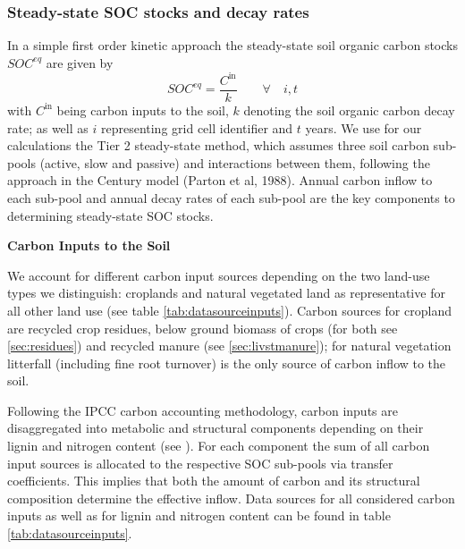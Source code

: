 \documentclass[gc, manuscript]{copernicus}
\begin{document}
\hypertarget{steady-state-soc-stocks-and-decay-rates}{%
\subsubsection{Steady-state SOC stocks and decay rates}\label{steady-state-soc-stocks-and-decay-rates}}

In a simple first order kinetic approach the steady-state soil organic carbon stocks \(SOC^{eq}\) are given by
\begin{equation}
SOC^{eq} =\frac{C^{\textrm{in}}}{k} \qquad\forall\quad i,t
\label{eq:inoutflow}
\end{equation}
with \(C^{\textrm{in}}\) being carbon inputs to the soil, \(k\) denoting the soil organic carbon decay rate; as well as \(i\) representing grid cell identifier and \(t\) years. We use for our calculations the Tier 2 steady-state method, which assumes three soil carbon sub-pools (active, slow and passive) and interactions between them, following the approach in the Century model (Parton et al, 1988). Annual carbon inflow to each sub-pool and annual decay rates of each sub-pool are the key components to determining steady-state SOC stocks.

\textbf{Carbon Inputs to the Soil}

We account for different carbon input sources depending on the two land-use types we distinguish: croplands and natural vegetated land as representative for all other land use (see table \ref{tab:datasourceinputs}). Carbon sources for cropland are recycled crop residues, below ground biomass of crops (for both see \ref{sec:residues}) and recycled manure (see \ref{sec:livstmanure}); for natural vegetation litterfall (including fine root turnover) \citep{schaphoff_lpjml4_2018} is the only source of carbon inflow to the soil.

Following the IPCC carbon accounting methodology, carbon inputs are disaggregated into metabolic and structural components depending on their lignin and nitrogen content (see \citet{ipcc_2019_2019}). For each component the sum of all carbon input sources is allocated to the respective SOC sub-pools via transfer coefficients. This implies that both the amount of carbon and its structural composition determine the effective inflow. Data sources for all considered carbon inputs as well as for lignin and nitrogen content can be found in table \ref{tab:datasourceinputs}.
\end{document}
